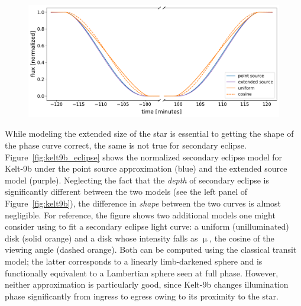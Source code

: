 \documentclass[modern]{aastex62}
\begin{document}
\begin{figure}[p!]
    \begin{centering}
        \includegraphics[width=\linewidth]{figures/kelt9b_eclipse.pdf}
    \end{centering}
\end{figure}

While modeling the extended size of the star is essential to
getting the shape of the phase curve correct, the same is not true
for secondary eclipse. Figure~\ref{fig:kelt9b_eclipse} shows
the normalized secondary eclipse model for Kelt-9b under the point
source approximation (blue) and the extended source model (purple).
Neglecting the fact that the \emph{depth} of secondary eclipse is
significantly different between the two models (see the left panel
of Figure~\ref{fig:kelt9b}), the difference in \emph{shape} between
the two curves is almost negligible.
%
For reference, the figure shows
two additional models one might consider using to fit a secondary
eclipse light curve: a uniform (unilluminated) disk (solid orange)
and a disk whose intensity falls as $\upmu$, the cosine of the
viewing angle (dashed orange). Both can be computed using the
classical \citet{MandelAgol2002} transit model; the latter corresponds
to a linearly limb-darkened sphere and is functionally equivalent to
a Lambertian sphere seen at full phase.
However, neither approximation is particularly good, since Kelt-9b
changes illumination phase significantly from ingress to egress
owing to its proximity to the star.
\end{document}

